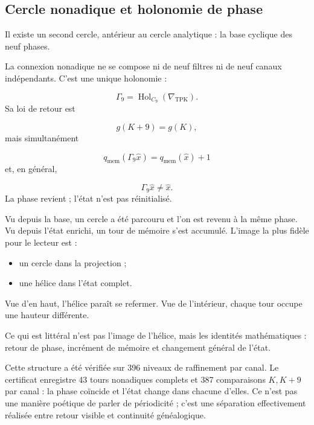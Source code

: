 \subsection{Cercle nonadique et holonomie de phase}
Il existe un second cercle, antérieur au cercle analytique : la base cyclique des neuf phases.\par
La connexion nonadique ne se compose ni de neuf filtres ni de neuf canaux indépendants. C’est une unique holonomie :\par
\[
\Gamma_9
=
\operatorname{Hol}_{C_9}
(\nabla_{\mathrm{TPK}}).
\]
Sa loi de retour est\par
\[
g(K+9)=g(K),
\]
mais simultanément\par
\[
q_{\mathrm{mem}}
(\Gamma_9\widehat x)
=
q_{\mathrm{mem}}(\widehat x)+1
\]
et, en général,\par
\[
\Gamma_9\widehat x
\neq
\widehat x.
\]
La phase revient ; l’état n’est pas réinitialisé.\par
Vu depuis la base, un cercle a été parcouru et l’on est revenu à la même phase. Vu depuis l’état enrichi, un tour de mémoire s’est accumulé. L’image la plus fidèle pour le lecteur est :\par
\begin{itemize}
\item un cercle dans la projection ;
\item une hélice dans l’état complet.
\end{itemize}
Vue d’en haut, l’hélice paraît se refermer. Vue de l’intérieur, chaque tour occupe une hauteur différente.\par
Ce qui est littéral n’est pas l’image de l’hélice, mais les identités mathématiques : retour de phase, incrément de mémoire et changement général de l’état.\par
Cette structure a été vérifiée sur 396 niveaux de raffinement par canal. Le certificat enregistre 43 tours nonadiques complets et 387 comparaisons \(K,K+9\) par canal : la phase coïncide et l’état change dans chacune d’elles. Ce n’est pas une manière poétique de parler de périodicité ; c’est une séparation effectivement réalisée entre retour visible et continuité généalogique.\par
{}
